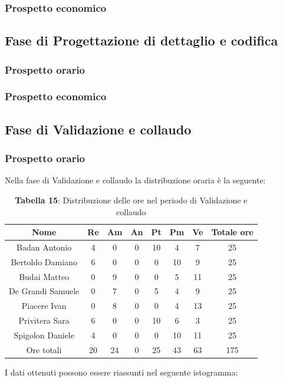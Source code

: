 \subsubsection{Prospetto economico}

\subsection{Fase di Progettazione di dettaglio e codifica}
\subsubsection{Prospetto orario}

\subsubsection{Prospetto economico}

\subsection{Fase di Validazione e collaudo}
\subsubsection{Prospetto orario}
Nella fase di Validazione e collaudo la distribuzione oraria è la seguente:

\begin{table}[H]
	\centering
	\renewcommand{\arraystretch}{1.5}
	\begin{tabular}{|c|c|c|c|c|c|c|c|}
		\hline
		\rowcolor{lighter-grayer}
		Nome & Re & Am & An & Pt & Pm & Ve & Totale ore\\
		\hline
		Badan Antonio & 4 & 0 & 0 &  10 & 4 & 7 & 25 \\
		\hline
		Bertoldo Damiano & 6 & 0 & 0 & 0 & 10 & 9 & 25 \\
		\hline
		Budai Matteo & 0 & 9 & 0 & 0 & 5 & 11 & 25 \\
		\hline
		De Grandi Samuele & 0 & 7 & 0 & 5 & 4 & 9 & 25 \\
		\hline
		Piacere Ivan & 0 & 8 & 0 & 0 & 4 & 13 & 25 \\
		\hline
		Privitera Sara & 6 & 0 & 0 & 10 & 6 & 3 & 25 \\
		\hline
		Spigolon Daniele & 4 & 0 & 0 & 0 & 10 & 11 & 25 \\
		\hline
		Ore totali & 20 & 24 & 0 & 25 & 43 & 63 & 175 \\
		\hline
	\end{tabular}
	\caption*{\textbf{Tabella 15}: Distribuzione delle ore nel periodo di Validazione e collaudo\\}
\end{table}	
	I dati ottenuti possono essere riassunti nel seguente istogramma:

